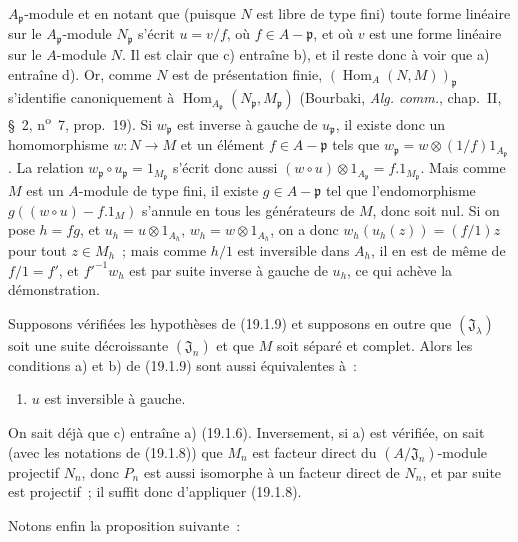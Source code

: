 $A_{\mathfrak p}$-module et en notant que (puisque $N$ est libre de type fini)
toute forme linéaire sur le $A_{\mathfrak p}$-module $N_{\mathfrak p}$ s'écrit
$u=v/f$, où $f\in A-\mathfrak p$, et où $v$ est une forme linéaire sur le
$A$-module $N$. Il est clair que c) entraîne b), et il reste donc à voir que a)
entraîne d). Or, comme $N$ est de présentation finie,
$(\operatorname{Hom}_A(N,M))_{\mathfrak p}$ s'identifie canoniquement à
$\operatorname{Hom}_{A_{\mathfrak p}}(N_{\mathfrak p},M_{\mathfrak p})$
(Bourbaki, \emph{Alg. comm.}, chap.~II, §~2, n\textsuperscript{o}~7,
prop.~19). Si $w_{\mathfrak p}$ est inverse à gauche de $u_{\mathfrak p}$, il
existe donc un homomorphisme $w:N\to M$ et un élément $f\in A-\mathfrak p$
tels que $w_{\mathfrak p}=w\otimes(1/f)1_{A_{\mathfrak p}}$. La relation
$w_{\mathfrak p}\circ u_{\mathfrak p}=1_{M_{\mathfrak p}}$ s'écrit donc aussi
$(w\circ u)\otimes1_{A_{\mathfrak p}}=f.1_{M_{\mathfrak p}}$. Mais comme $M$
est un $A$-module de type fini, il existe $g\in A-\mathfrak p$ tel que
l'endomorphisme $g((w\circ u)-f.1_M)$ s'annule en tous les générateurs de $M$,
donc soit nul. Si on pose $h=fg$, et
$u_h=u\otimes1_{A_h}$, $w_h=w\otimes1_{A_h}$, on a donc
$w_h(u_h(z))=(f/1)z$ pour tout $z\in M_h$~; mais comme $h/1$ est inversible
dans $A_h$, il en est de même de $f/1=f'$, et $f'^{-1}w_h$ est par suite
inverse à gauche de $u_h$, ce qui achève la démonstration.

\begin{proposition}[19.1.13]
\label{0.19.1.13-fr}
Supposons vérifiées les hypothèses de (19.1.9) et supposons en outre que
$(\mathfrak J_\lambda)$ soit une suite décroissante $(\mathfrak J_n)$ et que
$M$ soit séparé et complet. Alors les conditions a) et b) de (19.1.9) sont
aussi équivalentes à~:
\begin{enumerate}
  \item[c)] $u$ est inversible à gauche.
\end{enumerate}
\end{proposition}

On sait déjà que c) entraîne a) (19.1.6). Inversement, si a) est vérifiée, on
sait (avec les notations de (19.1.8)) que $M_n$ est facteur direct du
$(A/\mathfrak J_n)$-module projectif $N_n$, donc $P_n$ est aussi isomorphe à
un facteur direct de $N_n$, et par suite est projectif~; il suffit donc
d'appliquer (19.1.8).

Notons enfin la proposition suivante~:


